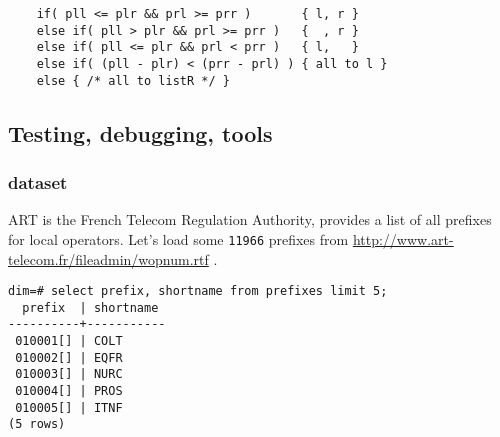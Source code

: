 \documentclass{beamer}
\begin{document}
\begin{frame}[fragile]
\begin{overprint}
  \begin{example}
  \begin{verbatim}
    if( pll <= plr && prl >= prr )       { l, r }
    else if( pll > plr && prl >= prr )   {  , r }
    else if( pll <= plr && prl < prr )   { l,   }
    else if( (pll - plr) < (prr - prl) ) { all to l }
    else { /* all to listR */ }
  \end{verbatim}
  \end{example}

  \end{overprint}

\end{frame}

\subsection{Testing, debugging, tools}

\begin{frame}[fragile]
  \frametitle{dataset}

  ART is the French Telecom Regulation Authority, provides a list of all
  prefixes for local operators. Let's load some \texttt{11966} prefixes from
  \url{http://www.art-telecom.fr/fileadmin/wopnum.rtf} .

  \pause

  \begin{example}
  \begin{verbatim}
dim=# select prefix, shortname from prefixes limit 5;                                                                                                              
  prefix  | shortname 
----------+-----------
 010001[] | COLT
 010002[] | EQFR
 010003[] | NURC
 010004[] | PROS
 010005[] | ITNF
(5 rows)
  \end{verbatim}
  \end{example}

\end{frame}
\end{document}

